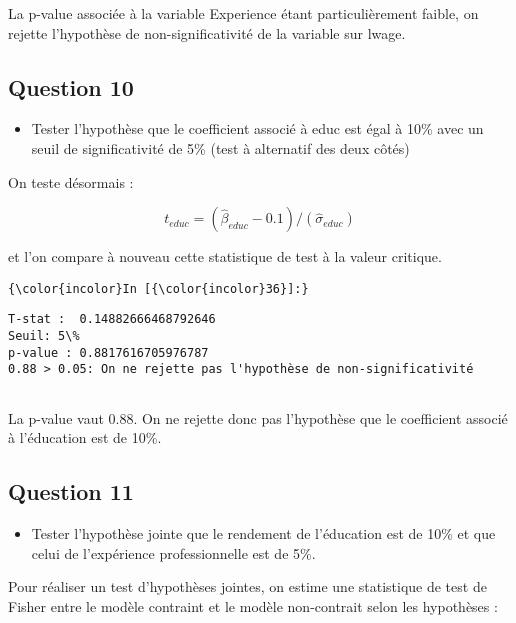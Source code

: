 \documentclass[11pt]{article}
\providecommand{\tightlist}{%
      \setlength{\itemsep}{0pt}\setlength{\parskip}{0pt}}
\begin{document}
    La p-value associée à la variable Experience étant particulièrement
faible, on rejette l'hypothèse de non-significativité de la variable sur
lwage.

    \subsection{Question 10}\label{question-10}

\begin{itemize}
\tightlist
\item
  Tester l'hypothèse que le coefficient associé à educ est égal à 10\%
  avec un seuil de significativité de 5\% (test à alternatif des deux
  côtés)
\end{itemize}

    On teste désormais :

\[ t_{educ} = ( \hat{\beta}_{educ} - 0.1 ) / ( \hat{\sigma}_{educ} ) \]

et l'on compare à nouveau cette statistique de test à la valeur
critique.

    \begin{Verbatim}[commandchars=\\\{\}]
{\color{incolor}In [{\color{incolor}36}]:} 
\end{Verbatim}


    \begin{Verbatim}[commandchars=\\\{\}]
T-stat :  0.14882666468792646
Seuil: 5\%
p-value : 0.8817616705976787
0.88 > 0.05: On ne rejette pas l'hypothèse de non-significativité 


    \end{Verbatim}

    La p-value vaut 0.88. On ne rejette donc pas l'hypothèse que le
coefficient associé à l'éducation est de 10\%.

    \subsection{Question 11}\label{question-11}

\begin{itemize}
\tightlist
\item
  Tester l'hypothèse jointe que le rendement de l'éducation est de 10\%
  et que celui de l'expérience professionnelle est de 5\%.
\end{itemize}

    Pour réaliser un test d'hypothèses jointes, on estime une statistique de
test de Fisher entre le modèle contraint et le modèle non-contrait selon
les hypothèses :
\end{document}
